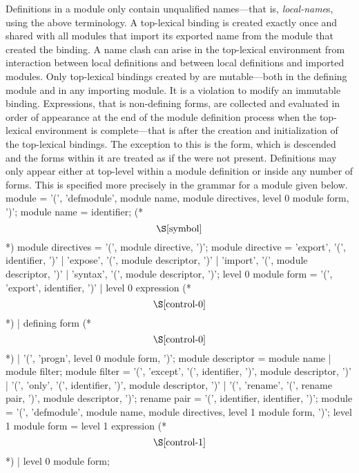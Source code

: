 %
\begin{optDefinition}
Definitions in a module only contain unqualified names---that is, {\em
    local-name}s, using the above terminology.  A top-lexical binding is created
exactly once and shared with all modules that import its exported name from the
module that created the binding.  A name clash can arise in the top-lexical
environment from interaction between local definitions and between local
definitions and imported modules.  Only top-lexical bindings created by
 are mutable---both in the defining module and in any
importing module.  It is a violation to modify an immutable binding.
Expressions, that is non-defining forms, are collected and evaluated in order of
appearance at the end of the module definition process when the top-lexical
environment is complete---that is after the creation and initialization of the
top-lexical bindings.  The exception to this is the  form,
which is descended and the forms within it are treated as if the
 were not present.  Definitions may only appear either at
top-level within a module definition or inside any number of 
forms.  This is specified more precisely in the grammar for a module given
below.
%
\Syntax
\savesyntax{}\vbox
{\small%
\syntax
module
   = '(', 'defmodule', module name,
     module directives, {level 0 module form}, ')';
module name
   = identifier; (* \[\S\ref{symbol}\] *)
module directives
   = '(', {module directive}, ')';
module directive
   = 'export', '(', {identifier}, ')'
   | 'expose', '(', {module descriptor}, ')'
   | 'import', '(', {module descriptor}, ')'
   | 'syntax', '(', {module descriptor}, ')';
level 0 module form
   = '(', 'export', {identifier}, ')'
   | level 0 expression (* \[\S\ref{control-0}\] *)
   | defining form (* \[\S\ref{control-0}\] *)
   | '(', 'progn', {level 0 module form}, ')';
module descriptor
   = module name
   | module filter;
module filter
   = '(', 'except', '(', {identifier}, ')',
     module descriptor, ')'
   | '(', 'only', '(', {identifier}, ')',
     module descriptor, ')'
   | '(', 'rename', '(', {rename pair}, ')',
     module descriptor, ')';
rename pair
   = '(', identifier, identifier, ')';
\endsyntax
}
%
\savesyntax{}\vbox{\small
\syntax
module
   = '(', 'defmodule', module name,
     module directives, {level 1 module form}, ')';
level 1 module form
   = level 1 expression (* \[\S\ref{control-1}\] *)
   | level 0 module form;
\endsyntax
}
\label{defmodule-syntax}
%
\end{optDefinition}

